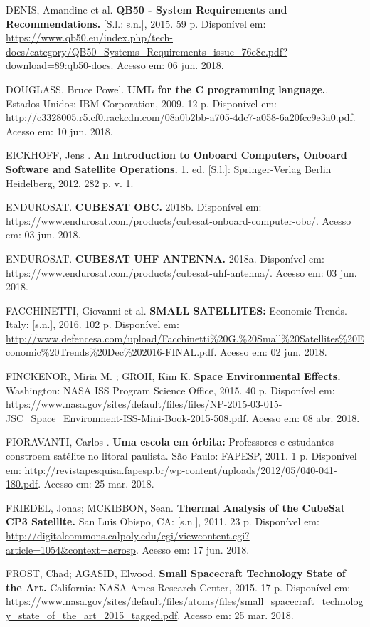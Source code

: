 \noindent DENIS, Amandine et al. \textbf{QB50 - System Requirements and Recommendations.} [S.l.: s.n.], 2015. 59 p. Disponível em: \url{ https://www.qb50.eu/index.php/tech-docs/category/QB50_Systems_Requirements_issue_76e8e.pdf?download=89:qb50-docs}. Acesso em: 06 jun. 2018.

\noindent DOUGLASS, Bruce Powel. \textbf{UML for the C programming language.}. Estados Unidos: IBM Corporation, 2009. 12 p. Disponível em: \url{http://c3328005.r5.cf0.rackcdn.com/08a0b2bb-a705-4dc7-a058-6a20fcc9e3a0.pdf}. Acesso em: 10 jun. 2018.

\noindent EICKHOFF, Jens . \textbf{An Introduction to Onboard Computers, Onboard Software and Satellite Operations.} 1. ed. [S.l.]: Springer-Verlag Berlin Heidelberg, 2012. 282 p. v. 1.

\noindent ENDUROSAT. \textbf{CUBESAT OBC. } 2018b. Disponível em: \url{https://www.endurosat.com/products/cubesat-onboard-computer-obc/}. Acesso em: 03 jun. 2018.

\noindent ENDUROSAT. \textbf{CUBESAT UHF ANTENNA. } 2018a. Disponível em: \url{https://www.endurosat.com/products/cubesat-uhf-antenna/}. Acesso em: 03 jun. 2018.

\noindent FACCHINETTI, Giovanni et al. \textbf{SMALL SATELLITES: } Economic Trends. Italy: [s.n.], 2016. 102 p. Disponível em: \url{http://www.defencesa.com/upload/Facchinetti\%20G.\%20Small\%20Satellites\%20Economic\%20Trends\%20Dec\%202016-FINAL.pdf}. Acesso em: 02 jun. 2018.

\noindent FINCKENOR, Miria M. ; GROH, Kim K. \textbf{Space Environmental Effects. } Washington: NASA ISS Program Science Office, 2015. 40 p. Disponível em: \url{https://www.nasa.gov/sites/default/files/files/NP-2015-03-015-JSC_Space_Environment-ISS-Mini-Book-2015-508.pdf}. Acesso em: 08 abr. 2018.

\noindent FIORAVANTI, Carlos . \textbf{Uma escola em órbita: } Professores e estudantes constroem satélite no litoral paulista. São Paulo: FAPESP, 2011. 1 p. Disponível em: \url{http://revistapesquisa.fapesp.br/wp-content/uploads/2012/05/040-041-180.pdf}. Acesso em: 25 mar. 2018.

\noindent FRIEDEL, Jonas; MCKIBBON, Sean. \textbf{Thermal Analysis of the CubeSat CP3 Satellite. } San Luis Obispo, CA: [s.n.], 2011. 23 p. Disponível em: \url{http://digitalcommons.calpoly.edu/cgi/viewcontent.cgi?article=1054&context=aerosp}. Acesso em: 17 jun. 2018.

\noindent FROST, Chad; AGASID, Elwood. \textbf{Small Spacecraft Technology State of the Art. } California: NASA Ames Research Center, 2015. 17 p. Disponível em: \url{https://www.nasa.gov/sites/default/files/atoms/files/small_spacecraft_technology_state_of_the_art_2015_tagged.pdf}. Acesso em: 25 mar. 2018.

